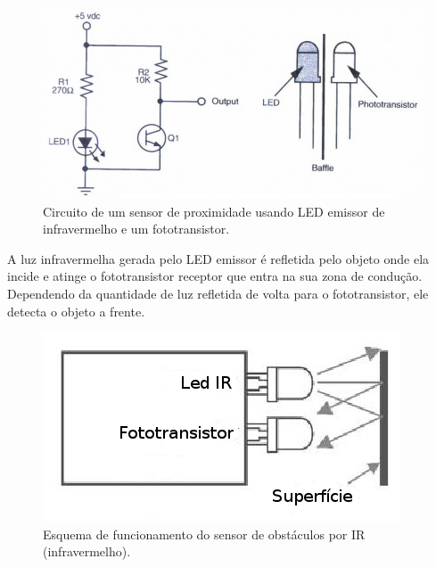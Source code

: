     \begin{figure}[H]                                       
      \centering                                            
      \includegraphics[scale=0.3]{figuras/sensor_proximidade.png} 
      \caption{Circuito de um sensor de proximidade usando LED emissor de infravermelho e um fototransistor.}    
      \label{img:sensor_proximidade}                                
    \end{figure}                                            

    A luz infravermelha gerada pelo LED emissor é refletida pelo objeto onde ela incide e atinge o fototransistor receptor que entra na sua zona de condução. Dependendo da quantidade de luz refletida de volta para o fototransistor, ele detecta o objeto a frente. 

    \begin{figure}[H]                                                           
      \centering                                                                
      \includegraphics[scale=0.5]{figuras/funcionamento_sensor_obstaculo.png}               
      \caption{ Esquema de funcionamento do sensor de obstáculos por IR (infravermelho).}    
      \label{img:esquema_sensor_proximidade}                                            
    \end{figure}         

